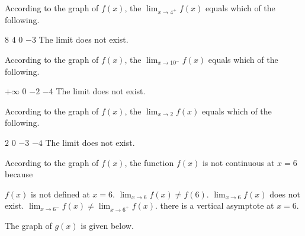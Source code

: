 \documentclass[11pt]{article}
\begin{document}
\begin{questions}
\begin{multiplechoice}{5}

\question According to the graph of $f(x)$, the $\lim_{x\to 4^+}f(x) $ equals which of the following.
\begin{answers}{3}
\ans $8$
\ans $4$
\ans $0$
\ans $-3$
\ans The limit does not exist.
\end{answers}



\question According to the graph of $f(x)$, the $\lim_{x\to 10^-}f(x) $ equals which of the following.
\begin{answers}{3}
\ans $+\infty$
\ans $0$
\ans $-2$
\ans $-4$
\ans The limit does not exist.
\end{answers}


\question According to the graph of $f(x)$, the $\lim_{x\to 2}f(x) $ equals which of the following.
\begin{answers}{3}
\ans $2$
\ans $0$
\ans $-3$
\ans $-4$
\ans The limit does not exist.
\end{answers}





\question According to the graph of $f(x)$, the function $f(x)$ is not continuous at $x=6$ because
\begin{answers}{3}
\ans $f(x)$ is not defined at $x=6$.
\ans $\lim_{x\to 6}f(x) \neq f(6)$.
\ans $\lim_{x\to 6}f(x)$ does not exist.
\ans $\lim_{x\to 6^-}f(x) \neq \lim_{x\to 6^+}f(x) $.
\ans there is a vertical asymptote at $x=6$.
\end{answers}





\question The graph of $g(x)$ is given below.\\


\end{multiplechoice}
\end{questions}
\end{document}
